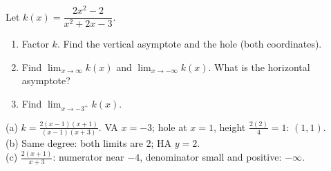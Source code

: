 \begin{exo}{}
Let $k(x)=\dfrac{2x^2-2}{x^2+2x-3}$.
\begin{enumerate}[label=(\alph*)]
\item Factor $k$. Find the vertical asymptote and the hole (both coordinates).
\item Find $\lim_{x\to\infty}k(x)$ and $\lim_{x\to-\infty}k(x)$. What is the horizontal asymptote?
\item Find $\lim_{x\to-3^+}k(x)$.
\end{enumerate}
\work{4cm}
\begin{solution}
(a) $k=\frac{2(x-1)(x+1)}{(x-1)(x+3)}$. VA $x=-3$; hole at $x=1$, height $\frac{2(2)}{4}=1$: $(1,1)$.\\
(b) Same degree: both limits are $2$; HA $y=2$.\\
(c) $\frac{2(x+1)}{x+3}$: numerator near $-4$, denominator small and positive: $-\infty$.
\end{solution}
\end{exo}

